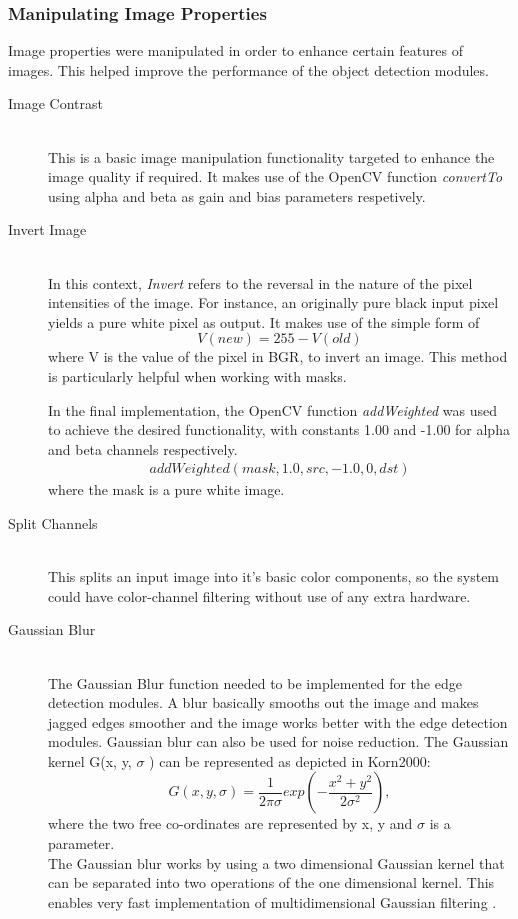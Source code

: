\subsubsection{Manipulating Image Properties} 
Image properties were manipulated in order to enhance certain features of images. This helped improve the performance of the object detection modules.
\begin{description}
\item[Image Contrast]\hfill \\
This is a basic image manipulation functionality targeted to enhance the image quality if required.
It makes use of the OpenCV function \emph{convertTo} using alpha and beta as gain and bias parameters respetively.

\item[Invert Image]\hfill \\
In this context, \emph{Invert} refers to the reversal in the nature of the pixel intensities of the image.
For instance, an originally pure black input pixel yields a pure white pixel as output.
It makes use of the simple form of  
\begin{equation} V(new) = 255 - V(old)  
\end{equation} 
where V is the value of the pixel in BGR, to invert an image. 
This method is particularly helpful when working with masks.

In the final implementation, the OpenCV function \emph{addWeighted} was used to achieve the desired functionality, with constants 1.00 and -1.00 for alpha and beta channels respectively.
\begin{align*}
addWeighted(mask, 1.0, src, -1.0, 0, dst)
\end{align*}
where the mask is a pure white image.

\item[Split Channels]\hfill \\
This splits an input image into it's basic color components, so the system could have color-channel filtering without use of any extra hardware.

\item[Gaussian Blur]\hfill \\
The Gaussian Blur function \cite{web:gaussianBlur}  needed to be implemented for the edge detection modules. A blur basically smooths out the image and makes jagged edges smoother and the image works better with the edge detection modules. Gaussian blur can also be used for noise reduction. The Gaussian kernel G(x, y, $\sigma$ ) can be represented as depicted in Korn2000:
\cite{korn2000mathematical}
\begin{equation}
G(x,y,\sigma)=\frac{1}{2\pi \sigma}exp(-\frac{x^2+y^2}{2\sigma ^2}),
\end{equation}
where the two free co-ordinates are represented by x, y and $\sigma$ is a parameter.
\\The Gaussian blur works by using a two dimensional Gaussian kernel that can be separated into two operations of the one dimensional kernel. This enables very fast implementation of multidimensional Gaussian filtering \cite{korn2000mathematical}.  


\end{description}

